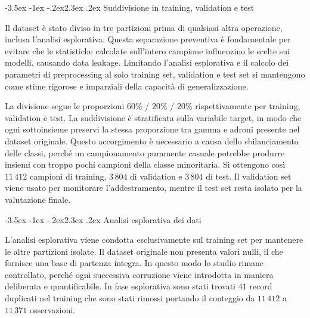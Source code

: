 \documentclass[12pt,a4paper]{article}
\makeatletter
\renewcommand\section{\@startsection{section}{1}{\z@}%
  {-3.5ex \@plus -1ex \@minus -.2ex}{2.3ex \@plus.2ex}%
  {\normalfont\Large\bfseries}}
\makeatother
\begin{document}
\section{Suddivisione in training, validation e test}\label{sec:split}

Il dataset è stato diviso in tre partizioni prima di qualsiasi altra operazione,
inclusa l'analisi esplorativa. Questa separazione preventiva è fondamentale per
evitare che le statistiche calcolate sull'intero campione influenzino le scelte
sui modelli, causando data leakage. Limitando l'analisi esplorativa e il calcolo
dei parametri di preprocessing al solo training set, validation e test set si
mantengono come stime rigorose e imparziali della capacità di generalizzazione.

La divisione segue le proporzioni $60\%$ / $20\%$ / $20\%$ rispettivamente per
training, validation e test. La suddivisione è stratificata sulla variabile
target, in modo che ogni sottoinsieme preservi la stessa proporzione tra gamma e
adroni presente nel dataset originale. Questo accorgimento è necessario a causa
dello sbilanciamento delle classi, perché un campionamento puramente casuale
potrebbe produrre insiemi con troppo pochi campioni della classe minoritaria. Si
ottengono così $11\,412$ campioni di training, $3\,804$ di validation e $3\,804$
di test. Il validation set viene usato per monitorare l'addestramento, mentre il
test set resta isolato per la valutazione finale.

\section{Analisi esplorativa dei dati}\label{sec:eda}

L'analisi esplorativa viene condotta esclusivamente sul training set per
mantenere le altre partizioni isolate. Il dataset originale non presenta valori
nulli, il che fornisce una base di partenza integra. In questo modo lo studio
rimane controllato, perché ogni successiva corruzione viene introdotta in
maniera deliberata e quantificabile. In fase esplorativa sono stati trovati $41$
record duplicati nel training che sono stati rimossi portando il 
conteggio da $11\,412$ a $11\,371$ osservazioni.
\end{document}
